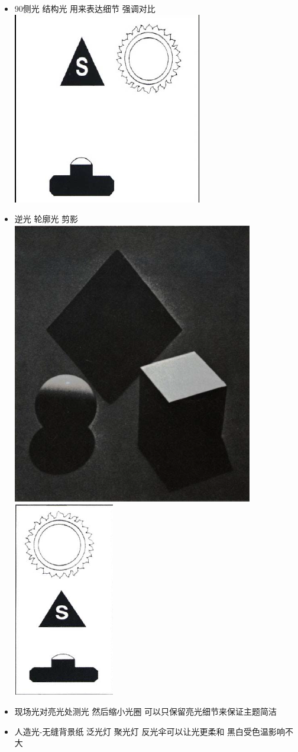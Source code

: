 \documentclass[
  letterpaper,
  DIV=11,
  numbers=noendperiod]{scrreprt}
\begin{document}
\begin{itemize}
\item
  90侧光 结构光 用来表达细节 强调对比 \includegraphics{images/right.png}
\item
  逆光 轮廓光 剪影 \includegraphics{images/back.png}
  \includegraphics{images/backpos.png}
\item
  现场光对亮光处测光 然后缩小光圈 可以只保留亮光细节来保证主题简洁
\item
  人造光-无缝背景纸 泛光灯 聚光灯 反光伞可以让光更柔和
  黑白受色温影响不大
\end{itemize}
\end{document}
